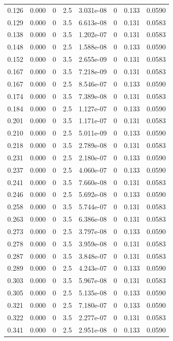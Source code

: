 \documentclass[preview]{standalone}
\begin{document}
{{\begin{tabular}{L{1.2cm}C{1.2cm} C{0.3cm}C{0.5cm} C{1.4cm}C{1.4cm} C{1.4cm}C{1.4cm}}
  0.126  &  0.000  & 0     & 2.5 &  3.031e-08  & 0  & 0.133 &  0.0590   \\ 
  0.129  &  0.000  & 0     & 3.5 &  6.613e-08  & 0  & 0.131 &  0.0583   \\ 
  0.138  &  0.000  & 0     & 3.5 &  1.202e-07  & 0  & 0.131 &  0.0583   \\ 
  0.148  &  0.000  & 0     & 2.5 &  1.588e-08  & 0  & 0.133 &  0.0590   \\ 
  0.152  &  0.000  & 0     & 3.5 &  2.655e-09  & 0  & 0.131 &  0.0583   \\ 
  0.167  &  0.000  & 0     & 3.5 &  7.218e-09  & 0  & 0.131 &  0.0583   \\ 
  0.167  &  0.000  & 0     & 2.5 &  8.546e-07  & 0  & 0.133 &  0.0590   \\ 
  0.174  &  0.000  & 0     & 3.5 &  7.389e-08  & 0  & 0.131 &  0.0583   \\ 
  0.184  &  0.000  & 0     & 2.5 &  1.127e-07  & 0  & 0.133 &  0.0590   \\ 
  0.201  &  0.000  & 0     & 3.5 &  1.171e-07  & 0  & 0.131 &  0.0583   \\ 
  0.210  &  0.000  & 0     & 2.5 &  5.011e-09  & 0  & 0.133 &  0.0590   \\ 
  0.218  &  0.000  & 0     & 3.5 &  2.789e-08  & 0  & 0.131 &  0.0583   \\ 
  0.231  &  0.000  & 0     & 2.5 &  2.180e-07  & 0  & 0.133 &  0.0590   \\ 
  0.237  &  0.000  & 0     & 2.5 &  4.060e-07  & 0  & 0.133 &  0.0590   \\ 
  0.241  &  0.000  & 0     & 3.5 &  7.660e-08  & 0  & 0.131 &  0.0583   \\ 
  0.246  &  0.000  & 0     & 2.5 &  5.692e-08  & 0  & 0.133 &  0.0590   \\ 
  0.258  &  0.000  & 0     & 3.5 &  5.744e-07  & 0  & 0.131 &  0.0583   \\ 
  0.263  &  0.000  & 0     & 3.5 &  6.386e-08  & 0  & 0.131 &  0.0583   \\ 
  0.273  &  0.000  & 0     & 2.5 &  3.797e-08  & 0  & 0.133 &  0.0590   \\ 
  0.278  &  0.000  & 0     & 3.5 &  3.959e-08  & 0  & 0.131 &  0.0583   \\ 
  0.287  &  0.000  & 0     & 3.5 &  3.848e-07  & 0  & 0.131 &  0.0583   \\ 
  0.289  &  0.000  & 0     & 2.5 &  4.243e-07  & 0  & 0.133 &  0.0590   \\ 
  0.303  &  0.000  & 0     & 3.5 &  5.967e-08  & 0  & 0.131 &  0.0583   \\ 
  0.305  &  0.000  & 0     & 2.5 &  5.135e-08  & 0  & 0.133 &  0.0590   \\ 
  0.321  &  0.000  & 0     & 2.5 &  7.180e-07  & 0  & 0.133 &  0.0590   \\ 
  0.322  &  0.000  & 0     & 3.5 &  2.277e-07  & 0  & 0.131 &  0.0583   \\ 
  0.341  &  0.000  & 0     & 2.5 &  2.951e-08  & 0  & 0.133 &  0.0590   \\ 
\hline 
\end{tabular} 

}}
\end{document}
